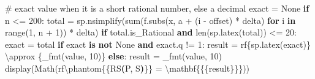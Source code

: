 \documentclass[
  letterpaper,
  DIV=11,
  numbers=noendperiod]{scrreprt}
\newenvironment{Shaded}{\begin{snugshade}}{\end{snugshade}}
\newcommand{\BuiltInTok}[1]{\textcolor[rgb]{0.00,0.23,0.31}{#1}}
\newcommand{\CharTok}[1]{\textcolor[rgb]{0.13,0.47,0.30}{#1}}
\newcommand{\CommentTok}[1]{\textcolor[rgb]{0.37,0.37,0.37}{#1}}
\newcommand{\ControlFlowTok}[1]{\textcolor[rgb]{0.00,0.23,0.31}{\textbf{#1}}}
\newcommand{\DecValTok}[1]{\textcolor[rgb]{0.68,0.00,0.00}{#1}}
\newcommand{\ErrorTok}[1]{\textcolor[rgb]{0.68,0.00,0.00}{#1}}
\newcommand{\KeywordTok}[1]{\textcolor[rgb]{0.00,0.23,0.31}{\textbf{#1}}}
\newcommand{\NormalTok}[1]{\textcolor[rgb]{0.00,0.23,0.31}{#1}}
\newcommand{\OperatorTok}[1]{\textcolor[rgb]{0.37,0.37,0.37}{#1}}
\newcommand{\SpecialCharTok}[1]{\textcolor[rgb]{0.37,0.37,0.37}{#1}}
\newcommand{\VariableTok}[1]{\textcolor[rgb]{0.07,0.07,0.07}{#1}}
\newcommand{\VerbatimStringTok}[1]{\textcolor[rgb]{0.13,0.47,0.30}{#1}}
\theoremstyle{plain}
\theoremstyle{plain}
\theoremstyle{definition}
\theoremstyle{definition}
\theoremstyle{definition}
\theoremstyle{plain}
\theoremstyle{plain}
\theoremstyle{remark}
\begin{document}
\begin{Shaded}
\begin{Highlighting}[]
    \CommentTok{\# exact value when it is a short rational number, else a decimal}
\NormalTok{    exact }\OperatorTok{=} \VariableTok{None}
    \ControlFlowTok{if}\NormalTok{ n }\OperatorTok{\textless{}=} \DecValTok{200}\NormalTok{:}
\NormalTok{        total }\OperatorTok{=}\NormalTok{ sp.nsimplify(}\BuiltInTok{sum}\NormalTok{(f.subs(x, a }\OperatorTok{+}\NormalTok{ (i }\OperatorTok{{-}}\NormalTok{ offset) }\OperatorTok{*}\NormalTok{ delta) }\ControlFlowTok{for}\NormalTok{ i }\KeywordTok{in} \BuiltInTok{range}\NormalTok{(}\DecValTok{1}\NormalTok{, n }\OperatorTok{+} \DecValTok{1}\NormalTok{)) }\OperatorTok{*}\NormalTok{ delta)}
        \ControlFlowTok{if}\NormalTok{ total.is\_Rational }\KeywordTok{and} \BuiltInTok{len}\NormalTok{(sp.latex(total)) }\OperatorTok{\textless{}=} \DecValTok{20}\NormalTok{:}
\NormalTok{            exact }\OperatorTok{=}\NormalTok{ total}
    \ControlFlowTok{if}\NormalTok{ exact }\KeywordTok{is} \KeywordTok{not} \VariableTok{None} \KeywordTok{and}\NormalTok{ exact.q }\OperatorTok{!=} \DecValTok{1}\NormalTok{:}
\NormalTok{        result }\OperatorTok{=} \VerbatimStringTok{rf\textquotesingle{}}\SpecialCharTok{\{}\NormalTok{sp}\SpecialCharTok{.}\NormalTok{latex(exact)}\SpecialCharTok{\}}\VerbatimStringTok{ }\CharTok{\textbackslash{}a}\VerbatimStringTok{pprox }\SpecialCharTok{\{}\NormalTok{\_fmt(value, }\DecValTok{10}\NormalTok{)}\SpecialCharTok{\}}\VerbatimStringTok{\textquotesingle{}}
    \ControlFlowTok{else}\NormalTok{:}
\NormalTok{        result }\OperatorTok{=}\NormalTok{ \_fmt(value, }\DecValTok{10}\NormalTok{)}
\NormalTok{    display(Math(}\VerbatimStringTok{rf\textquotesingle{}}\ErrorTok{\textbackslash{}}\VerbatimStringTok{phantom}\CharTok{\{\{}\VerbatimStringTok{RS}\KeywordTok{(}\VerbatimStringTok{P, S}\KeywordTok{)}\CharTok{\}\}}\VerbatimStringTok{ = }\DecValTok{\textbackslash{}m}\VerbatimStringTok{athbf}\CharTok{\{\{}\SpecialCharTok{\{}\NormalTok{result}\SpecialCharTok{\}}\CharTok{\}\}}\VerbatimStringTok{\textquotesingle{}}\NormalTok{))}


\end{Highlighting}
\end{Shaded}
\end{document}
